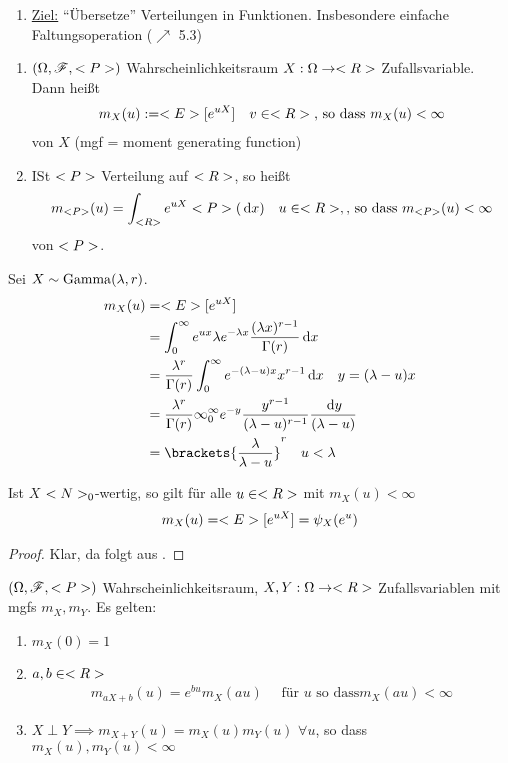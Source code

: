 \begin{enumerate}[label=]
	\item \ul{Ziel:} ``Übersetze'' Verteilungen in Funktionen. Insbesondere einfache Faltungsoperation ($\nearrow$ 5.3) %
\end{enumerate}
\begin{definition}
	\begin{enumerate}
		\item $(\O,\F,\P)$ Wahrscheinlichkeitsraum $X: \O \to \R$ Zufallsvariable. Dann heißt
		\begin{align*}
			m_X(u) := \E[e^{uX}] \quad v\in \R\text{, so dass } m_X(u) < \infty
		\end{align*}
		 von $X$ (mgf = moment generating function)
		\item ISt $\P$ Verteilung auf $\R$, so heißt
		\begin{align*}
			m_{\P}(u) = \int_{\R}e^{uX} \P(\d x) \quad u \in \R,\text{, so dass } m_{\P}(u) < \infty
		\end{align*}
		 von $\P$.
	\end{enumerate}
\end{definition}
\begin{example}
	Sei $X \sim \Gam(\lambda,r)$.
	\begin{align*}
		m_X(u) &= \E[e^{uX}]\\
		&= \int_{0}^{\infty} e^{ux}\lambda e^{-\lambda x}\frac{(\lambda x)^{r-1}}{\Gamma(r)}\d x\\
		&= \frac{\lambda^r}{\Gamma(r)} \int_{0}^{\infty}e^{-(\lambda-u)x}x^{r-1}\d x \quad y= (\lambda-u)x\\
		&= \frac{\lambda^r}{\Gamma(r)}\infty_0^{\infty} e^{-y}\frac{y^{r-1}}{(\lambda-u)^{r-1}}\frac{\d y}{(\lambda-u)}\\
		&= \brackets{\frac{\lambda}{\lambda-u}}^r \quad u < \lambda
	\end{align*}
\end{example}
\begin{lemma}
	Ist $X$ $\N_0$-wertig, so gilt für alle $u \in \R$ mit $m_X(u) < \infty$
	\begin{align*}
		m_X(u) = \E[e^{uX}] = \psi_X(e^u)
	\end{align*}
\end{lemma}
\begin{proof}
	Klar, da folgt aus .
\end{proof}
\begin{proposition}
	$(\O,\F,\P)$ Wahrscheinlichkeitsraum, $X,Y: \O \to \R$ Zufallsvariablen mit mgfs $m_X,m_Y$. Es gelten:
	\begin{enumerate}
		\item $m_X(0) = 1$
		\item $a,b \in \R$
		\begin{align*}
			m_{aX+b}(u) = e^{bu}m_X(au) \quad \text{ für } u \text{ so dass} m_X(au) < \infty
		\end{align*}
		\item $X \perp Y \implies m_{X+Y}(u) = m_X(u)m_Y(u)$ $\forall u$, so dass $m_X(u), m_Y(u) < \infty$ 
	\end{enumerate}
\end{proposition}
